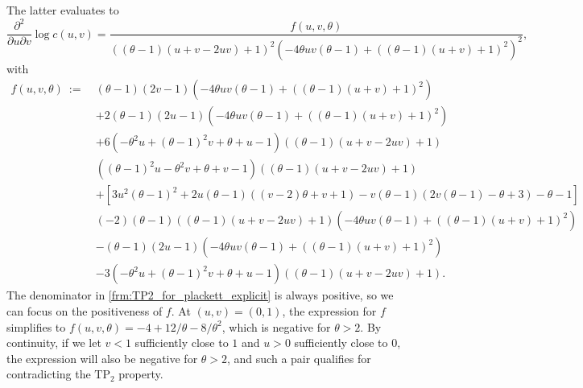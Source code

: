 \documentclass{article}
\newcommand{\TP}{\mathrm{TP_2}}
\begin{document}
\begin{itemize}
    The latter evaluates to
    \small
    \begin{equation}
        \label{frm:TP2_for_plackett_explicit}
        \frac{\partial^2}{\partial u \partial v}\log c(u,v)
        = \frac{f(u,v, \theta)}{\left((\theta-1) (u + v - 2uv) + 1\right)^{2} \left(- 4 \theta u v \left(\theta - 1\right) + \left(\left(\theta - 1\right) \left(u + v\right) + 1\right)^{2}\right)^{2}} 
    ,\end{equation}
    \normalsize
    with 
    \small
    \begin{align*}
        f(u,v, \theta) ~:=~ & (\theta-1)(2 v - 1) \left(- 4 \theta u v \left(\theta - 1\right) + \left(\left(\theta - 1\right) \left(u + v\right) + 1\right)^{2}\right) \\
        & + 2 (\theta-1)(2 u - 1) \left(- 4 \theta u v \left(\theta - 1\right) + \left(\left(\theta - 1\right) \left(u + v\right) + 1\right)^{2}\right) \\
        & + 6 \left(- \theta^{2} u + (\theta-1)^{2} v + \theta + u - 1\right) \left((\theta-1) (u + v - 2uv) + 1\right) \\
        & \left((\theta-1)^{2} u - \theta^{2} v + \theta + v - 1\right) \left((\theta-1) (u + v - 2uv) + 1\right) \\
        & + \left[
            3 u^2 (\theta - 1)^2 + 2 u (\theta - 1) ((v - 2) \theta + v + 1) - v (\theta - 1) (2 v (\theta - 1) - \theta + 3) - \theta - 1 \right] \\
        &(-2) ( \theta - 1)\left((\theta-1) (u + v - 2uv) + 1\right)
        \left(- 4 \theta u v \left(\theta - 1\right) + \left(\left(\theta - 1\right) \left(u + v\right) + 1\right)^{2}\right) \\
        & - (\theta-1)(2 u - 1)\left(- 4 \theta u v \left(\theta - 1\right) + \left(\left(\theta - 1\right) \left(u + v\right) + 1\right)^{2}\right)  \\
        & - 3 \left(- \theta^{2} u + (\theta-1)^{2} v + \theta + u - 1\right) \left((\theta-1) (u + v - 2uv) + 1\right)
    .\end{align*}
    \normalsize
    The denominator in \eqref{frm:TP2_for_plackett_explicit} is always positive, so we can focus on the positiveness of $f$.
    At $(u, v) = (0, 1)$, the expression for $f$ simplifies to $f(u,v, \theta) = -4 + 12/\theta - 8/\theta^2$, which is negative for $\theta > 2$.
    By continuity, if we let $v<1$ sufficiently close to $1$ and $u>0$ sufficiently close to $0$, the expression will also be negative for $\theta > 2$, and such a pair qualifies for contradicting the $\TP$ property.

\end{itemize}
\end{document}
